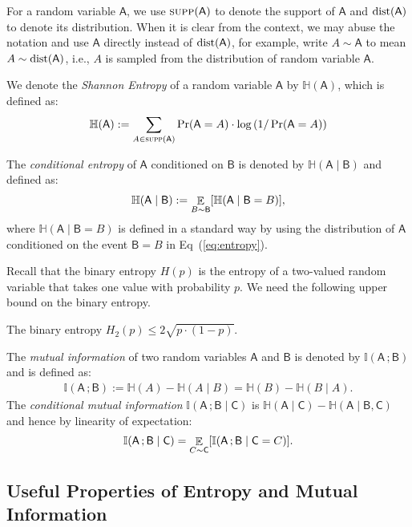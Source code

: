 \documentclass[11pt,letterpaper]{article}
\DeclareMathOperator*{\E}{\mathbb{E}}
\renewcommand{\leq}{\leqslant}
\theoremstyle{definition}
\newcommand{\bracket}[1]{\mleft[#1\mright]}
\newcommand{\paren}[1]{\ensuremath{\mleft(#1\mright)}\xspace}
\newcommand{\supp}[1]{\ensuremath{\textsc{supp}(#1)}}
\newcommand{\rA}{\rv{A}}
\newcommand{\rB}{\rv{B}}
\newcommand{\rC}{\rv{C}}
\newcommand{\rv}[1]{\ensuremath{\mathsf{#1}}}
\newcommand{\II}{\ensuremath{\mathbb{I}}}
\newcommand{\HH}{\ensuremath{\mathbb{H}}}
\newcommand{\mi}[2]{\ensuremath{\II(#1 \,; #2)}}
\newcommand{\en}[1]{\ensuremath{\HH(#1)}}
\newcommand{\distribution}[1]{\ensuremath{\textnormal{dist}(#1)}\xspace}
\begin{document}
For a random variable $\rA$, we use $\supp{\rA}$ to denote the support of $\rA$ and $\distribution{\rA}$ to denote its distribution. 
When it is clear from the context, we may abuse the notation and use $\rA$ directly instead of $\distribution{\rA}$, for example, write 
$A \sim \rA$ to mean $A \sim \distribution{\rA}$, i.e., $A$ is sampled from the distribution of random variable $\rA$. 


We denote the \emph{Shannon Entropy} of a random variable $\rA$ by
$\en{\rA}$, which is defined as: 
\begin{align}
	\en{\rA} := \sum_{A \in \supp{\rA}} \Pr\paren{\rA = A} \cdot \log{\paren{1/\Pr\paren{\rA = A}}} \label{eq:entropy}
\end{align} 

\noindent
The \emph{conditional entropy} of $\rA$ conditioned on $\rB$ is denoted by $\en{\rA \mid \rB}$ and defined as:
\begin{align}
\en{\rA \mid \rB} := \E_{B \sim \rB} \bracket{\en{\rA \mid \rB = B}}, \label{eq:cond-entropy}
\end{align}
where 
$\en{\rA \mid \rB = B}$ is defined in a standard way by using the distribution of $\rA$ conditioned on the event $\rB = B$ in Eq~(\ref{eq:entropy}). 

\noindent
Recall that the binary entropy $H(p)$ is the entropy of a two-valued random
variable that takes one value with probability $p$.
We need the following upper bound on the binary entropy.

\begin{fact}\label{fact:ent-ub}
  The binary entropy $H_2(p) \leq 2 \sqrt{ p \cdot (1 - p) }$.
\end{fact}


 
The \emph{mutual information} of two random variables $\rA$ and $\rB$ is denoted by
$\mi{\rA}{\rB}$ and is defined as:
\begin{align}
\mi{\rA}{\rB} := \en{A} - \en{A \mid  B} = \en{B} - \en{B \mid  A}. \label{eq:mi}
\end{align}
\noindent
The \emph{conditional mutual information} $\mi{\rA}{\rB \mid \rC}$ is $\en{\rA \mid \rC} - \en{\rA \mid \rB,\rC}$ and hence by linearity of expectation:
\begin{align}
	\mi{\rA}{\rB \mid \rC} = \E_{C \sim \rC} \bracket{\mi{\rA}{\rB \mid \rC = C}}. \label{eq:cond-mi}
\end{align} 



\subsection{Useful Properties of Entropy and Mutual Information}\label{sec:prop-en-mi}
\end{document}
